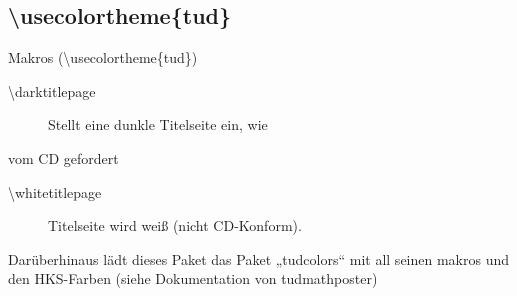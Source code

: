 \documentclass[presentation,t]{beamer}
\begin{document}
\subsection{\textbackslash usecolortheme\{tud\}}
\label{sec:orge42ca70}

\begin{frame}[label={sec:org5ad9746}]{Makros (\textbackslash usecolortheme\{tud\})}
\begin{description}
\item[{\textbackslash darktitlepage}] Stellt eine dunkle Titelseite ein, wie
\end{description}
vom CD gefordert
\begin{description}
\item[{\textbackslash whitetitlepage}] Titelseite wird weiß (nicht CD-Konform).
\end{description}

Darüberhinaus lädt dieses Paket das Paket „tudcolors“ mit all seinen
makros und den HKS-Farben (siehe Dokumentation von tudmathposter)
\end{frame}
\end{document}
